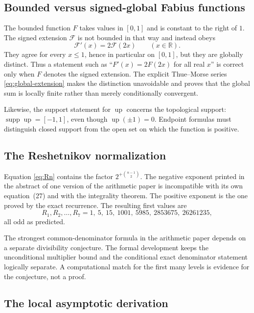 \documentclass[11pt,oneside]{article}
\theoremstyle{definition}
\theoremstyle{remark}
\newcommand{\R}{\mathbb R}
\newcommand{\Up}{\operatorname{up}}
\newcommand{\supp}{\operatorname{supp}}
\begin{document}
\subsection{Bounded versus signed-global Fabius functions}

The bounded function $F$ takes values in $[0,1]$ and is constant to the right of $1$.
The signed extension $\mathcal F$ is not bounded in that way and instead obeys
\begin{equation*}
 \mathcal F'(x)=2\mathcal F(2x)\qquad(x\in\R).
\end{equation*}
They agree for every $x\le1$, hence in particular on $[0,1]$, but they are globally
distinct.  Thus a statement such as ``$F'(x)=2F(2x)$ for all real
$x$'' is correct only when $F$ denotes the signed extension.  The explicit
Thue--Morse series \eqref{eq:global-extension} makes the distinction unavoidable and proves
that the global sum is locally finite rather than merely conditionally convergent.

Likewise, the support statement for $\Up$ concerns the topological support:
$\supp\Up=[-1,1]$, even though $\Up(\pm1)=0$.  Endpoint formulas must distinguish
closed support from the open set on which the function is positive.

\subsection{The Reshetnikov normalization}

Equation \eqref{eq:Rn} contains the factor
$2^{+\binom{n-1}{2}}$.  The negative exponent printed in the abstract of one version of the
arithmetic paper is incompatible with its own equation~(27) and with the integrality
theorem.  The positive exponent is the one proved by the exact recurrence.  The resulting
first values are
\begin{equation}
 R_1,R_2,\ldots,R_7
 =
 1,\ 5,\ 15,\ 1001,\ 5985,\ 2853675,\ 26261235,          \label{eq:R-first-values}
\end{equation}
all odd as predicted.

The strongest common-denominator formula in the arithmetic paper depends on a separate
divisibility conjecture.  The formal development keeps the unconditional multiplier bound
and the conditional exact denominator statement logically separate.  A computational match
for the first many levels is evidence for the conjecture, not a proof.

\subsection{The local asymptotic derivation}
\end{document}
